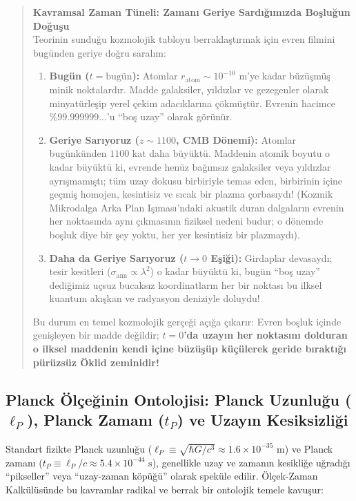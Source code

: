 \begin{quote}
    \small
    \textbf{Kavramsal Zaman Tüneli: Zamanı Geriye Sardığımızda Boşluğun Doğuşu} \\
    Teorinin sunduğu kozmolojik tabloyu berraklaştırmak için evren filmini bugünden geriye doğru saralım:
    \begin{enumerate}
        \item \textbf{Bugün ($t = \text{bugün}$):} Atomlar $r_{\mathrm{atom}} \sim 10^{-10}\text{ m}$'ye kadar büzüşmüş minik noktalardır. Madde galaksiler, yıldızlar ve gezegenler olarak minyatürleşip yerel çekim adacıklarına çökmüştür. Evrenin hacimce $\%99.999999...$'u ``boş uzay'' olarak görünür.
        \item \textbf{Geriye Sarıyoruz ($z \sim 1100$, CMB Dönemi):} Atomlar bugünkünden $1100$ kat daha büyüktü. Maddenin atomik boyutu o kadar büyüktü ki, evrende henüz bağımsız galaksiler veya yıldızlar ayrışmamıştı; tüm uzay dokusu birbiriyle temas eden, birbirinin içine geçmiş homojen, kesintisiz ve sıcak bir plazma çorbasıydı! (Kozmik Mikrodalga Arka Plan Işıması'ndaki akustik duran dalgaların evrenin her noktasında aynı çıkmasının fiziksel nedeni budur; o dönemde boşluk diye bir şey yoktu, her yer kesintisiz bir plazmaydı).
        \item \textbf{Daha da Geriye Sarıyoruz ($t \to 0$ Eşiği):} Girdaplar devasaydı; tesir kesitleri ($\sigma_{\mathrm{ann}} \propto \lambda^2$) o kadar büyüktü ki, bugün ``boş uzay'' dediğimiz uçsuz bucaksız koordinatların her bir noktası bu ilksel kuantum akışkan ve radyasyon deniziyle doluydu!
    \end{enumerate}
    Bu durum en temel kozmolojik gerçeği açığa çıkarır: Evren boşluk içinde genişleyen bir madde değildir; \textbf{$t=0$'da uzayın her noktasını dolduran o ilksel maddenin kendi içine büzüşüp küçülerek geride bıraktığı pürüzsüz Öklid zeminidir!}
\end{quote}

\subsection{Planck Ölçeğinin Ontolojisi: Planck Uzunluğu (\texorpdfstring{$\ell_P$}{l_P}), Planck Zamanı (\texorpdfstring{$t_P$}{t_P}) ve Uzayın Kesiksizliği}
\label{sec:planck_ontolojisi_main}

Standart fizikte Planck uzunluğu ($\ell_P \equiv \sqrt{\hbar G/c^3} \approx 1.6 \times 10^{-35}\text{ m}$) ve Planck zamanı ($t_P \equiv \ell_P/c \approx 5.4 \times 10^{-44}\text{ s}$), genellikle uzay ve zamanın kesikliğe uğradığı ``pikseller'' veya ``uzay-zaman köpüğü'' olarak speküle edilir. Ölçek-Zaman Kalkülüsünde bu kavramlar radikal ve berrak bir ontolojik temele kavuşur:

